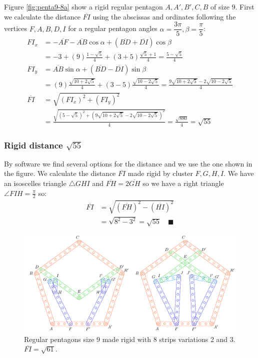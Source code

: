 \documentclass[11pt]{article}
\begin{document}
Figure \ref{fig:penta9-8a} show a rigid regular pentagon $A,A',B',C,B$ of size $9$. First we calculate the distance $\overline{FI}$ using the abscissas and ordinates following the vertices $F,A,B,D,I$ for a regular pentagon angles $\alpha=\dfrac{3\pi}5, \beta=\dfrac{\pi}5$:
\begin{align}
FI_x &= -\overline{AF} - \overline{AB}\cos\alpha + (\overline{BD} + \overline{DI})\cos\beta\nonumber\\
 &= -3 + (9)\frac{1-\sqrt5}4 + (3+5)\frac{\sqrt5+1}4 = \frac{5-\sqrt5}4\\
FI_y &= \overline{AB}\sin\alpha + (\overline{BD}-\overline{DI})\sin\beta\nonumber\\
 &= (9)\frac{\sqrt{10+2\sqrt5}}4 + (3-5)\frac{\sqrt{10-2\sqrt5}}4
 = \frac{9\sqrt{10+2\sqrt5} - 2\sqrt{10-2\sqrt5}}4\\
\overline{FI} &= \sqrt{(FI_x)^2 + (FI_y)^2}\nonumber\\
 &= \frac{\sqrt{(5-\sqrt5)^2 + (9\sqrt{10+2\sqrt5} - 2\sqrt{10-2\sqrt5})^2}}4
 = \frac{\sqrt{880}}4 = \sqrt{55}
\end{align}

\subsubsection{Rigid distance $\sqrt{55}$}

By software we find several options for the distance and we use the one shown in the figure.
We calculate the distance $\overline{FI}$ made rigid by cluster $F,G,H,I$. We have an isoscelles triangle $\triangle{GHI}$ and $\overline{FH}=2\overline{GH}$ so we have a right triangle $\angle{FIH}=\frac{\pi}2$ so: \begin{align}
\overline{FI} &= \sqrt{(\overline{FH})^2 - (\overline{HI})^2}\nonumber\\
 &= \sqrt{8^2 - 3^2} = \sqrt{55} \quad\blacksquare
\end{align}

\begin{figure}[H]
 \centering
 \includegraphics[scale=0.95]{9/penta9-8b}
 \caption{Regular pentagons size 9 made rigid with 8 strips variations 2 and 3. $\overline{FI} = \sqrt{61}$.}
 \label{fig:penta9-8b}
\end{figure}
\end{document}
